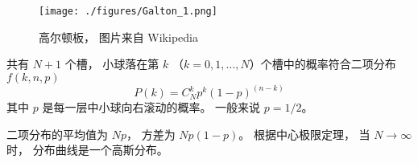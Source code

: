 
\begin{issues}
\issueDraft
\end{issues}


\begin{figure}[ht]
\centering
\texttt{[image: ./figures/Galton\_1.png]}
\caption{高尔顿板， 图片来自 Wikipedia} \label{Galton_fig1}
\end{figure}

共有 $N+1$ 个槽， 小球落在第 $k$ （$k = 0,1,\dots,N$）个槽中的概率符合二项分布 $f(k,n,p)$
\begin{equation}
P(k) = C_N^k p^k (1-p)^{(n-k)}
\end{equation}
其中 $p$ 是每一层中小球向右滚动的概率。 一般来说 $p = 1/2$。

二项分布的平均值为 $Np$， 方差为 $Np(1-p)$。 根据中心极限定理， 当 $N\to\infty$ 时， 分布曲线是一个高斯分布。
